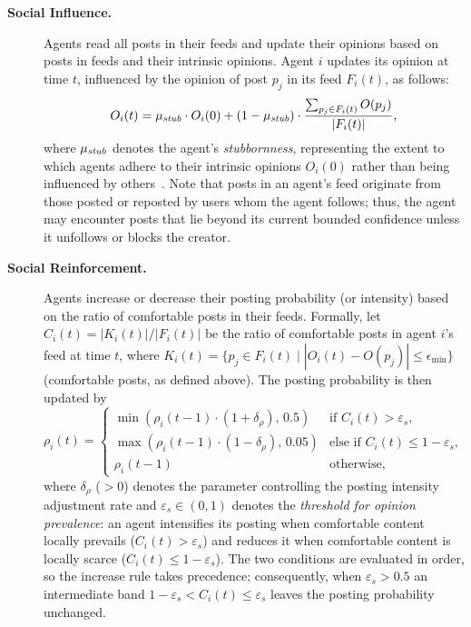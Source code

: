 \documentclass[pdflatex,sn-mathphys-num]{sn-jnl}%
\theoremstyle{thmstyleone}%
\theoremstyle{thmstyletwo}%
\theoremstyle{thmstylethree}%
\def\Dgreen{\color[rgb]{0.02,0.55,0.04}}
\def\post{\rho} %
\def\Stubbornness{\mu_{\it stub}}
\def\ThofOpPreval{\varepsilon_s}
\begin{document}
\begin{description}
\item[{\bf Social Influence.}] Agents read all posts in their feeds
  and update their opinions based on posts in feeds and their intrinsic
  opinions. Agent $i$ updates its opinion at time $t$, influenced by
  the opinion of post $p_j$ in its feed $F_i(t)$, as follows:
  \begin{equation}\label{FJmodel}
   O_i(t) = \Stubbornness \cdot O_i(0) + (1 - \Stubbornness) \cdot \frac{\sum_{p_j \in F_i(t)} O(p_j)}{|F_i(t)|},
  \end{equation}
where $\Stubbornness$ denotes the agent’s \emph{stubbornness},
representing the extent to which agents adhere to their intrinsic
opinions $O_i(0)$ rather than being influenced by others~\cite{Friedkin1990}. Note that
posts in an agent's feed originate from those posted or reposted by
users whom the agent follows; thus, the agent may encounter posts that lie
beyond its current bounded confidence unless it unfollows or blocks the creator.

\Dgreen
\item[{\bf Social Reinforcement.}]
 Agents increase or decrease
  their posting probability (or intensity) based on the
  ratio of comfortable posts in their feeds. Formally, let $C_i(t)=
  |K_i(t)|/|F_i(t)|$ be the ratio of comfortable posts in agent $i$'s
  feed at time $t$, where $K_i(t)=\{p_j \in F_i(t) \mid |O_i(t) - O(p_j)|
  \leq \epsilon_{\min}\}$ (comfortable posts, as defined above). The posting
  probability is then updated by
  \begin{equation}\label{eq:SocialReinforcement}
    \post_i(t) =
    \begin{cases}
      \min(\post_i(t-1) \cdot (1 + \delta_{\post}),\, 0.5)
        & \text{if } C_i(t) > \ThofOpPreval,\\[2pt]
      \max(\post_i(t-1) \cdot (1 - \delta_{\post}),\, 0.05)
        & \text{else if } C_i(t) \leq 1-\ThofOpPreval,\\[2pt]
      \post_i(t-1) & \text{otherwise,}
    \end{cases}
  \end{equation}
where $\delta_{\post}$ ($> 0$) denotes the parameter controlling the
posting intensity adjustment rate and $\ThofOpPreval \in (0,1)$ denotes
the {\em threshold for opinion prevalence}: an agent intensifies its posting
when comfortable content locally prevails ($C_i(t) > \ThofOpPreval$) and
reduces it when comfortable content is locally scarce ($C_i(t) \leq 1-\ThofOpPreval$).
The two conditions are evaluated in order, so the increase rule takes precedence;
consequently, when $\ThofOpPreval > 0.5$ an intermediate band
$1-\ThofOpPreval < C_i(t) \leq \ThofOpPreval$ leaves the posting probability unchanged.


\end{description}
\end{document}
